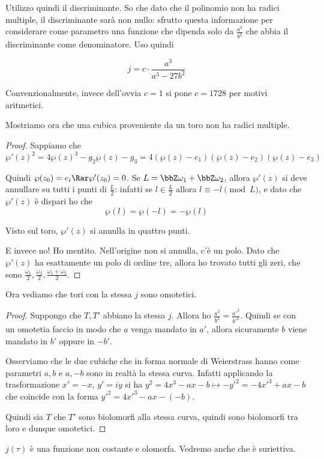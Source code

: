 	Utilizzo quindi il discriminante. So che dato che il polinomio non ha radici multiple, il discriminante sarà non nullo: sfrutto questa informazione per considerare come parametro una funzione che dipenda solo da $\frac{a^3}{b^2}$ che abbia il discriminante come denominatore. Uso quindi

	\[
		j = c \cdot \frac {a^3}{a^3-27b^2}
	\]

	Convenzionalmente, invece dell'ovvia $c=1$ si pone $c=1728$ per motivi aritmetici.

	Mostriamo ora che una cubica proveniente da un toro non ha radici multiple.

	\begin{proof}
		Sappiamo che
		\[
			\wp'(z)^2=4\wp(z)^3-g_2\wp(z)-g_3 = 4(\wp(z)-e_1)(\wp(z)-e_2)(\wp(z)-e_3)
		\]

		Quindi $\wp(z_0)=e_i \Rar\wp'(z_0)=0$.
		Se $L=\bbZ\omega_1 + \bbZ\omega_2$, allora $\wp'(z)$ si deve annullare su tutti i punti di $\frac L2$: infatti se $l \in \frac L2$ allora $l \equiv -l \pmod L$, e dato che $\wp'(z)$ è dispari ho che
		\[
			\wp(l) = \wp(-l) = -\wp(l)
		\]

		Visto sul toro, $\wp'(z)$ si annulla in quattro punti.

		E invece no! Ho mentito. Nell'origine non si annulla, c'è un polo. Dato che $\wp'(z)$ ha esattamente un polo di ordine tre, allora ho trovato tutti gli zeri, che sono $\frac{\omega_1}2, \frac{\omega_2}2, \frac{\omega_1+\omega_2}2$.


	\end{proof}

	Ora vediamo che tori con la stessa $j$ sono omotetici.

	\begin{proof}
          Suppongo che $T, T'$ abbiano la stessa $j$. Allora ho $\frac{a^3}{b^2}=\frac{a'^3}{b'^2}$. Quindi se con un omotetia faccio in modo che $a$ venga mandato in $a'$, allora sicuramente $b$ viene mandato in $b'$ oppure in $-b'$.

          Osserviamo che le due cubiche che in forma normale di Weierstrass hanno come parametri $a, b$ e $a, -b$ sono in realtà la stessa curva. Infatti applicando la trasformazione $x' = -x$, $y' = iy$ si ha $y^2 = 4x^3 - ax - b \mapsto - y'^2 = - 4x'^3 + ax - b$ che coincide con la forma $y'^2 = 4x'^3 - ax - (-b)$.

          Quindi sia $T$ che $T'$ sono biolomorfi alla stessa curva, quindi sono biolomorfi tra loro e dunque omotetici.
	\end{proof}

	\begin{osservazione}
		$j(\tau)$ è una funzione non costante e olomorfa. Vedremo anche che è suriettiva.
	\end{osservazione}
